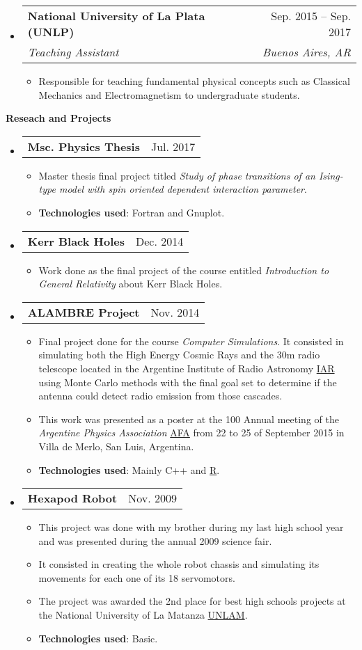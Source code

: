 \documentclass[letterpaper,12pt]{article}[leftmargin=*]
\makeatletter
\def \entryspacing {-0pt}
\renewcommand{\section}[2]{\vspace{5pt}
  \colorbox{secondary}{\color{white}\raggedbottom\normalsize\textbf{{#1}{\hspace{7pt}#2}}}
}
\newcommand{\resumeEntryStart}{\begin{itemize}[leftmargin=2.5mm]}
\newcommand{\resumeEntryEnd}{\end{itemize}\vspace{\entryspacing}}
\newcommand{\resumeItemListStart}{\begin{itemize}[leftmargin=4.5mm]}
\newcommand{\resumeItemListEnd}{\end{itemize}}
\newcommand{\resumeItem}[1]{
  \item\small{
    {#1 \vspace{-2pt}}
  }
}
\newcommand{\resumeEntryTSDL}[4]{
  \vspace{-1pt}\item[]
    \begin{tabularx}{0.97\textwidth}{X@{\hspace{60pt}}r}
      \textbf{\color{primary}#1} & {\firabook\color{accent}\small#2} \\
      \textit{\color{accent}\small#3} & \textit{\color{accent}\small#4} \\
    \end{tabularx}\vspace{-6pt}
}
\newcommand{\resumeEntryTD}[2]{
  \vspace{-1pt}\item[]
    \begin{tabularx}{0.97\textwidth}{X@{\hspace{60pt}}r}
      \textbf{\color{primary}#1} & {\firabook\color{accent}\small#2} \\
    \end{tabularx}\vspace{-6pt}
}
\makeatother
\begin{document}
  \resumeEntryStart
    \resumeEntryTSDL
      {National University of La Plata (UNLP) \href{https://unlp.edu.ar/}{\faGlobe} }{Sep. 2015 -- Sep. 2017}
      {Teaching Assistant}{Buenos Aires, AR}
    \resumeItemListStart
        \resumeItem {Responsible for teaching fundamental physical concepts such as Classical Mechanics and Electromagnetism to undergraduate students.}
    \resumeItemListEnd
  \resumeEntryEnd


\section{\faFlask}{Reseach and Projects}

  \resumeEntryStart
   \resumeEntryTD
      {Msc. Physics Thesis}{Jul. 2017}
    \resumeItemListStart
      \resumeItem {Master thesis final project titled \emph{Study of phase transitions of an Ising-type model with spin oriented dependent interaction parameter}.}
      \resumeItem {\textbf{Technologies used}: Fortran and Gnuplot.}
  \resumeItemListEnd
  \resumeEntryEnd

  \resumeEntryStart
   \resumeEntryTD
      {Kerr Black Holes}{Dec. 2014}
    \resumeItemListStart
      \resumeItem {Work done as the final project of the course entitled \emph{Introduction to General Relativity} about Kerr Black Holes.}
  \resumeItemListEnd
  \resumeEntryEnd
  
\resumeEntryStart
   \resumeEntryTD
      {ALAMBRE Project}{Nov. 2014}
    \resumeItemListStart
      \resumeItem {Final project done for the course \emph{Computer Simulations}. It consisted in simulating both the High Energy Cosmic Rays and the 30m radio telescope located in the Argentine Institute of Radio Astronomy \href{https://www.iar.unlp.edu.ar/}{IAR} using Monte Carlo methods with the final goal set to determine if the antenna could detect radio emission from those cascades.}
      \resumeItem {This work was presented as a poster at the 100 Annual meeting of the \emph{Argentine Physics Association} \href{https://www.fisica.org.ar/}{AFA} from 22 to 25 of September 2015 in Villa de Merlo, San Luis, Argentina. }
      \resumeItem {\textbf{Technologies used}: Mainly C++ and \href{https://www.r-project.org/about.html}{R}.}
  \resumeItemListEnd
  \resumeEntryEnd
  
\resumeEntryStart
   \resumeEntryTD
      {Hexapod Robot}{Nov. 2009}
    \resumeItemListStart
      \resumeItem {This project was done with my brother during my last high school year and was presented during the annual 2009 science fair.}
      \resumeItem {It consisted in creating the whole robot chassis and simulating its movements for each one of its 18 servomotors.}
      \resumeItem {The project was awarded the 2nd place for best high schools projects at the National University of La Matanza \href{https://www.unlam.edu.ar/}{UNLAM}. }
      \resumeItem {\textbf{Technologies used}: Basic.}
  \resumeItemListEnd
  \resumeEntryEnd
  
\end{document}

